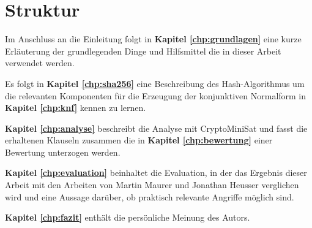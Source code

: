 \section{Struktur}

Im Anschluss an die Einleitung folgt in \textbf{Kapitel \ref{chp:grundlagen}} eine kurze Erläuterung der
grundlegenden Dinge und Hilfsmittel die in dieser Arbeit verwendet werden. 

Es folgt in \textbf{Kapitel \ref{chp:sha256}} eine Beschreibung des Hash-Algorithmus  um die relevanten
Komponenten für die Erzeugung der konjunktiven Normalform in \textbf{Kapitel \ref{chp:knf}} kennen zu lernen.

\textbf{Kapitel \ref{chp:analyse}} beschreibt die Analyse mit CryptoMiniSat und fasst die erhaltenen Klauseln
zusammen die in \textbf{Kapitel \ref{chp:bewertung}} einer Bewertung unterzogen werden.

\textbf{Kapitel \ref{chp:evaluation}} beinhaltet die Evaluation, in der das Ergebnis dieser Arbeit mit den
Arbeiten von Martin Maurer und Jonathan Heusser verglichen wird und eine Aussage darüber, ob praktisch
relevante Angriffe möglich sind.

\textbf{Kapitel \ref{chp:fazit}} enthält die persönliche Meinung des Autors.